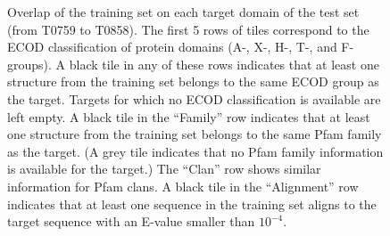 \begin{figure}[H]
%
    \caption{Overlap of the training set on each target domain of the
    test set (from T0759 to T0858). The first 5 rows of tiles
    correspond to the ECOD classification of protein domains (A-, X-,
    H-, T-, and F-groups). A black tile in any of these rows indicates
    that at least one structure from the training set belongs to the
    same ECOD group as the target. Targets for which no ECOD
    classification is available are left empty.
    A black tile in the ``Family'' row indicates that at least one
    structure from the training set belongs to the same Pfam family as
    the target. (A grey tile indicates that no Pfam family information
    is available for the target.) The ``Clan'' row shows similar
    information for Pfam clans. A black tile in the ``Alignment'' row
    indicates that at least one sequence in the training set aligns to
    the target sequence with an E-value smaller than $10^{-4}$.}
%
    \label{Fig:summaryTable}
\end{figure}
